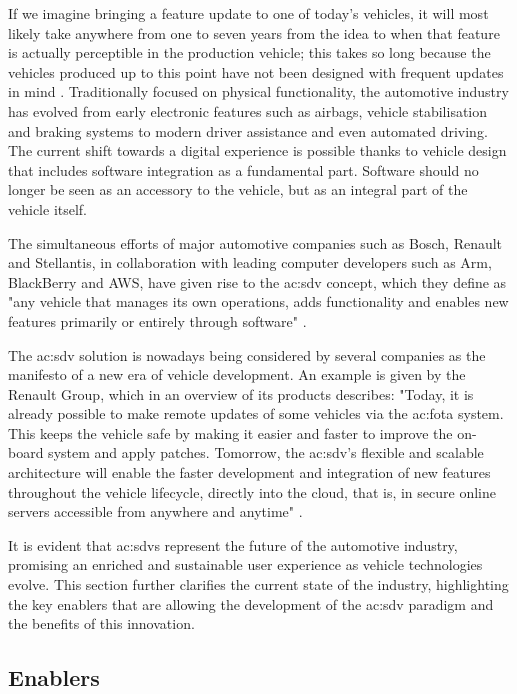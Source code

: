 If we imagine bringing a feature update to one of today's vehicles, it will most likely take anywhere from one to seven years from the idea to when that feature is actually perceptible in the production vehicle; this takes so long because the vehicles produced up to this point have not been designed with frequent updates in mind \cite{SDVBosch}.
Traditionally focused on physical functionality, the automotive industry has evolved from early electronic features such as airbags, vehicle stabilisation and braking systems to modern driver assistance and even automated driving. 
The current shift towards a digital experience is possible thanks to vehicle design that includes software integration as a fundamental part. Software should no longer be seen as an accessory to the vehicle, but as an integral part of the vehicle itself.

The simultaneous efforts of major automotive companies such as Bosch, Renault and Stellantis, in collaboration with leading computer developers such as Arm, BlackBerry and AWS, have given rise to the \gls{ac:sdv} concept, which they define as "any vehicle that manages its own operations, adds functionality and enables new features primarily or entirely through software" \cite{blackberrySDV}.

The \gls{ac:sdv} solution is nowadays being considered by several companies as the manifesto of a new era of vehicle development. An example is given by the Renault Group, which in an overview of its products describes: "Today, it is already possible to make remote updates of some vehicles via the \gls{ac:fota} system. This keeps the vehicle safe by making it easier and faster to improve the on-board system and apply patches. Tomorrow, the \gls{ac:sdv}'s flexible and scalable architecture will enable the faster development and integration of new features throughout the vehicle lifecycle, directly into the cloud, that is, in secure online servers accessible from anywhere and anytime" \cite{SDVRenault}. 

It is evident that \gls{ac:sdv}s represent the future of the automotive industry, promising an enriched and sustainable user experience as vehicle technologies evolve. This section further clarifies the current state of the industry, highlighting the key enablers that are allowing the development of the \gls{ac:sdv} paradigm and the benefits of this innovation.

\subsection{Enablers}

